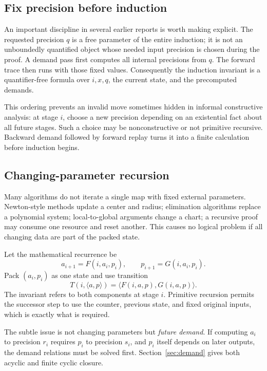 \subsection{Fix precision before induction}

An important discipline in several earlier reports is worth making explicit.  The requested precision
\(q\) is a free parameter of the entire induction; it is not an unboundedly quantified object whose needed
input precision is chosen during the proof.  A demand pass first computes all internal precisions from
\(q\).  The forward trace then runs with those fixed values.  Consequently the induction invariant is a
quantifier-free formula over \(i,x,q\), the current state, and the precomputed demands.

This ordering prevents an invalid move sometimes hidden in informal constructive analysis: at stage \(i\),
choose a new precision depending on an existential fact about all future stages.  Such a choice may be
nonconstructive or not primitive recursive.  Backward demand followed by forward replay turns it into a
finite calculation before induction begins.

\subsection{Changing-parameter recursion}

Many algorithms do not iterate a single map with fixed external parameters.  Newton-style methods update a
center and radius; elimination algorithms replace a polynomial system; local-to-global arguments change a
chart; a recursive proof may consume one resource and reset another.  This causes no logical problem if all
changing data are part of the packed state.

Let the mathematical recurrence be
\[
  a_{i+1}=F(i,a_i,p_i),
  \qquad
  p_{i+1}=G(i,a_i,p_i).
\]
Pack \((a_i,p_i)\) as one state and use transition
\[
  T(i,\langle a,p\rangle)=\langle F(i,a,p),G(i,a,p)\rangle.
\]
The invariant refers to both components at stage \(i\).  Primitive recursion permits the successor step to
use the counter, previous state, and fixed original inputs, which is exactly what is required.

The subtle issue is not changing parameters but \emph{future demand}.  If computing \(a_i\) to precision
\(r_i\) requires \(p_i\) to precision \(s_i\), and \(p_i\) itself depends on later outputs, the demand
relations must be solved first.  Section~\ref{sec:demand} gives both acyclic and finite cyclic closure.

